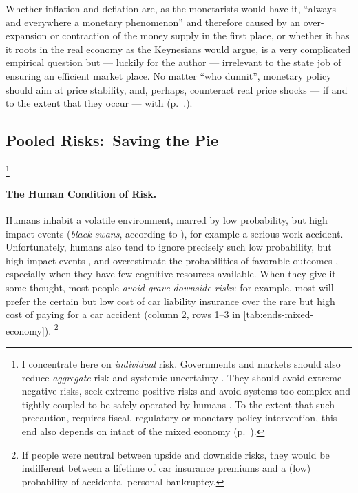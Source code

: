 Whether inflation and deflation are, as the monetarists would have it, ``always and everywhere a monetary phenomenon'' \citep{Friedman1970}
and therefore caused by an over-expansion or contraction of the money supply in the first place, or whether it has it roots in the real economy as the Keynesians would argue, is a very complicated empirical question but --- luckily for the author --- irrelevant to the state job of ensuring an efficient market place.
No matter ``who dunnit'', monetary policy should aim at price stability, and, perhaps, counteract real price shocks --- if and to the extent that they occur --- with  (p.~\pageref{sec:monetary-stimulus}.).%

\subsection[Pooled Risks]{Pooled Risks:\ Saving the Pie} \label{sec:risk}
\footnote{
	I concentrate here on \emph{individual} risk.
	Governments and markets should also reduce \emph{aggregate} risk and systemic uncertainty \citep{Knight1921}.
	They should avoid extreme negative risks, seek extreme positive risks \citep{Taleb2007} and avoid systems too complex and tightly coupled to be safely operated by humans \citep{Perrow-1999-aa}.
	To the extent that such precaution, requires fiscal, regulatory or monetary policy intervention, this end also depends on intact  of the mixed economy (p.~\pageref{sec:means}).
}

\paragraph{The Human Condition of Risk.}  \label{sec:human-nature-of-risk} Humans inhabit a volatile environment, marred by low probability, but high impact events (\emph{black swans}, according to \citealt{Taleb2007}), for example a serious work accident.
Unfortunately, humans also tend to ignore precisely such low probability, but high impact events \citep{Taleb2007}, and overestimate the probabilities of favorable outcomes \citep[44]{Baron2000}, especially when they have few cognitive resources available.
When they give it some thought, most people \emph{avoid grave downside risks}:
for example, most will prefer the certain but low cost of car liability insurance over the rare but high cost of paying for a car accident (column 2, rows 1--3 in \autoref{tab:ends-mixed-economy}).
\footnote{
	If people were neutral between upside and downside risks, they would be indifferent between a lifetime of car insurance premiums and a (low) probability of accidental personal bankruptcy.
}

